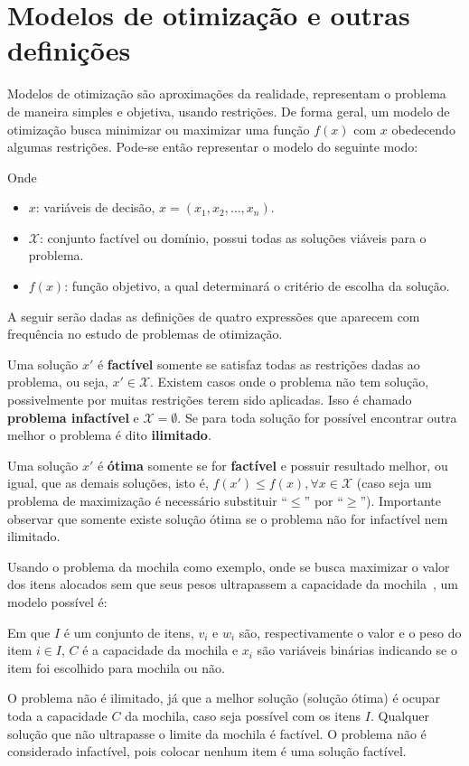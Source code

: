 \section{Modelos de otimização e outras definições}\label{sec:modelos-de-otimizacao}

Modelos de otimização são aproximações da realidade, representam o problema de maneira simples
e objetiva, usando restrições.
De forma geral, um modelo de otimização busca minimizar ou maximizar uma função $f(x)$ com $x$
obedecendo algumas restrições.
Pode-se então representar o modelo do seguinte modo:



Onde

\begin{itemize}
    \item $x$: variáveis de decisão, $x = (x_1, x_2, \dots, x_n)$.
    \item $\mathcal{X}$: conjunto factível ou domínio, possui todas as soluções viáveis para o problema.
    \item $f(x)$: função objetivo, a qual determinará o critério de escolha da solução.
\end{itemize}

A seguir serão dadas as definições de quatro expressões que aparecem com frequência no estudo de
problemas de otimização.

Uma solução $x'$ é \textbf{factível} somente se satisfaz todas as restrições dadas ao problema,
ou seja, $x' \in \mathcal{X}$.
Existem casos onde o problema não tem solução, possivelmente por muitas restrições terem sido
aplicadas.
Isso é chamado \textbf{problema infactível} e $\mathcal{X} = \emptyset$.
Se para toda solução for possível encontrar outra melhor o problema é dito \textbf{ilimitado}.

Uma solução $x'$ é \textbf{ótima} somente se for \textbf{factível} e possuir resultado melhor,
ou igual, que as demais soluções, isto é, $f(x') \le f(x), \forall x \in \mathcal{X}$ (caso seja um
problema de maximização é necessário substituir “$\le$” por “$\ge$”).
Importante observar que somente existe solução ótima se o problema não for infactível nem ilimitado.

Usando o problema da mochila como exemplo, onde se busca maximizar o valor dos itens alocados
sem que seus pesos ultrapassem a capacidade da mochila~\cite{exact-solution-techniques},
um modelo possível é:



Em que $I$ é um conjunto de itens, $v_{i}$ e $w_{i}$ são, respectivamente o valor e o peso do item
$i \in I$, $C$ é a capacidade da mochila e $x_{i}$ são variáveis binárias indicando se o
item foi escolhido para mochila ou não.

O problema não é ilimitado, já que a melhor solução (solução ótima) é ocupar toda a capacidade $C$
da mochila, caso seja possível com os itens $I$.
Qualquer solução que não ultrapasse o limite da mochila é factível.
O problema não é considerado infactível, pois colocar nenhum item é uma solução factível.
